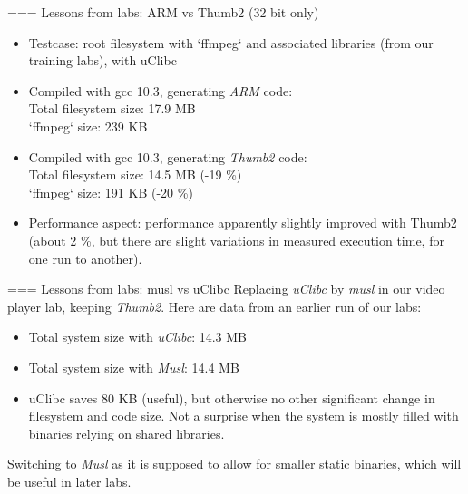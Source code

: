 === Lessons from labs: ARM vs Thumb2 (32 bit only)
\begin{itemize}
\item Testcase: root filesystem with `ffmpeg` and associated
      libraries (from our training labs), with uClibc
\item Compiled with gcc 10.3, generating {\em ARM} code:\\
      Total filesystem size: 17.9 MB\\
      `ffmpeg` size: 239 KB
\item Compiled with gcc 10.3, generating {\em Thumb2} code:\\
      Total filesystem size: 14.5 MB (-19 \%)\\
      `ffmpeg` size: 191 KB (-20 \%)
\item Performance aspect: performance apparently slightly improved with Thumb2
      (about 2 \%, but there are slight variations in measured
      execution time, for one run to another).
\end{itemize}


=== Lessons from labs: musl vs uClibc Replacing {\em uClibc} by {\em musl} in our video player lab, keeping
{\em Thumb2}. Here are data from an earlier run of our labs:
\begin{itemize}
   \item Total system size with {\em uClibc}: 14.3 MB
   \item Total system size with {\em Musl}: 14.4 MB
   \item uClibc saves 80 KB (useful), but otherwise no other significant change
    in filesystem and code size. Not a surprise when the system is mostly filled
    with binaries relying on shared libraries.
\end{itemize}
Switching to {\em Musl} as it is supposed to allow for smaller static binaries, which will be useful in later labs.

